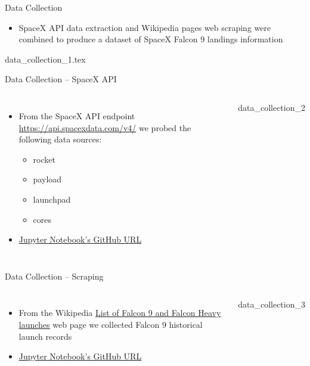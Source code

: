\begin{frame}{Data Collection}
    \begin{itemize}
        \item SpaceX API data extraction and Wikipedia pages web scraping were combined to produce a dataset of SpaceX Falcon 9 landings information
    \end{itemize}
    {data_collection_1.tex}
\end{frame}

{\nologo
\begin{frame}{Data Collection -- SpaceX API}
    \begin{columns}
            \begin{itemize}
                \item From the SpaceX API endpoint \url{https://api.spacexdata.com/v4/} we probed the following data sources:
                \begin{itemize}
                    \item rocket
                    \item payload
                    \item launchpad
                    \item cores
                \end{itemize}
                \item \href{https://github.com/eyamrog/ibm_data_science/blob/main/10_Data_Science_Capstone_Lab1_Collecting_the_Data.ipynb}{\uline{Jupyter Notebook's GitHub URL}}
            \end{itemize}
            {data_collection_2}
    \end{columns}
\end{frame}
}

{\nologo
\begin{frame}{Data Collection -- Scraping}
    \begin{columns}
            \begin{itemize}
                \item From the Wikipedia \href{https://en.wikipedia.org/wiki/List_of_Falcon_9_and_Falcon_Heavy_launches}{\uline{List of Falcon 9 and Falcon Heavy launches}} web page we collected Falcon 9 historical launch records
                \item \href{https://github.com/eyamrog/ibm_data_science/blob/main/10_Data_Science_Capstone_Web_Scraping.ipynb}{\uline{Jupyter Notebook's GitHub URL}}
            \end{itemize}
            {data_collection_3}
    \end{columns}
\end{frame}
}

